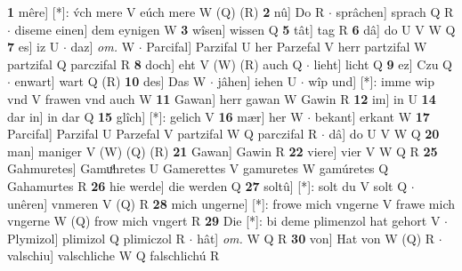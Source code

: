 \documentclass[8pt,a4paper,notitlepage]{article}
\begin{document}
\begin{table}[ht]
\begin{minipage}[t]{0.5\linewidth}
\textbf{1} mêre] [*]: v́ch mere V eúch mere W (Q) (R) \textbf{2} nû] Do R  $\cdot$ sprâchen] sprach Q R  $\cdot$ diseme einen] dem eynigen W \textbf{3} wîsen] wissen Q \textbf{5} tât] tag R \textbf{6} dâ] do U V W Q \textbf{7} es] iz U  $\cdot$ daz] \textit{om.} W  $\cdot$ Parcifal] Parzifal U her Parzefal V herr partzifal W partzifal Q parczifal R \textbf{8} doch] eht V (W) (R) auch Q  $\cdot$ lieht] licht Q \textbf{9} ez] Czu Q  $\cdot$ enwart] wart Q (R) \textbf{10} des] Das W  $\cdot$ jâhen] iehen U  $\cdot$ wîp und] [*]: imme wip vnd V frawen vnd auch W \textbf{11} Gawan] herr gawan W Gawin R \textbf{12} im] in U \textbf{14} dar in] in dar Q \textbf{15} glîch] [*]: gelich V \textbf{16} mær] her W  $\cdot$ bekant] erkant W \textbf{17} Parcifal] Parzifal U Parzefal V partzifal W Q parczifal R  $\cdot$ dâ] do U V W Q \textbf{20} man] maniger V (W) (Q) (R) \textbf{21} Gawan] Gawin R \textbf{22} viere] vier V W Q R \textbf{25} Gahmuretes] Gamuͦhretes U Gamerettes V gamuretes W gamúretes Q Gahamurtes R \textbf{26} hie werde] die werden Q \textbf{27} soltû] [*]: solt du V solt Q  $\cdot$ unêren] vnmeren V (Q) R \textbf{28} mich ungerne] [*]: frowe mich vngerne V frawe mich vngerne W (Q) frow mich vngert R \textbf{29} Die [*]: bi deme plimenzol hat gehort V  $\cdot$ Plymizol] plimizol Q plimiczol R  $\cdot$ hât] \textit{om.} W Q R \textbf{30} von] Hat von W (Q) R  $\cdot$ valschiu] valschliche W Q falschlichú R \newline
\end{minipage}
\end{table}
\end{document}
